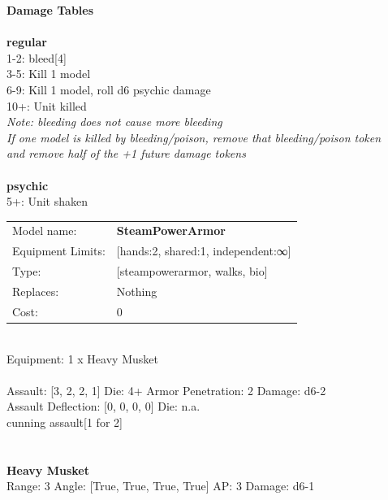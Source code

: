 {\bf Damage Tables} \\
\ \\ {\bf regular } \\
1-2: bleed[4] \\
3-5: Kill 1 model \\
6-9: Kill 1 model, roll d6 psychic damage \\
10+: Unit killed \\
{{\it Note: bleeding does not cause more bleeding}} \\
{{\it If one model is killed by bleeding/poison, remove that bleeding/poison token}} \\
{{\it and remove half of the +1 future damage tokens}} \\
\ \\ {\bf psychic } \\
5+: Unit shaken \\


\noindent
\begin{tabular}{ll}
Model name: &{\bf SteamPowerArmor } \\
Equipment Limits: &[hands:2, shared:1, independent:∞] \\
Type: &[steampowerarmor, walks, bio] \\
Replaces: &Nothing \\
Cost: & 0\\
\end{tabular}
\ \\
Equipment: 1 x Heavy Musket \\
\ \\
Assault: [3, 2, 2, 1] Die: 4+ Armor Penetration: 2 Damage: d6-2 \\
Assault Deflection: [0, 0, 0, 0] Die: n.a.\\
\indent cunning assault[1 for 2]\\ 
 
\ \\

\ \\
{\bf Heavy Musket } \\



Range: 3  Angle: [True, True, True, True] AP: 3 Damage: d6-1 \\




 
\ \\













